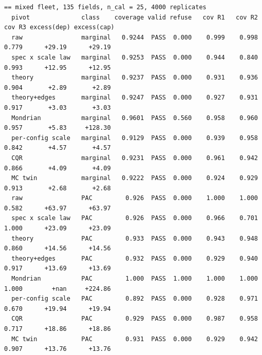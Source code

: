 \documentclass[preprint,12pt,authoryear]{elsarticle}
\begin{document}
\begin{Verbatim}[fontsize=\tiny,breaklines]
== mixed fleet, 135 fields, n_cal = 25, 4000 replicates
  pivot              class    coverage valid refuse   cov R1   cov R2   cov R3 excess(dep) excess(cap)
  raw                marginal   0.9244  PASS  0.000    0.999    0.998    0.779      +29.19      +29.19
  spec x scale law   marginal   0.9253  PASS  0.000    0.944    0.840    0.993      +12.95      +12.95
  theory             marginal   0.9237  PASS  0.000    0.931    0.936    0.904       +2.89       +2.89
  theory+edges       marginal   0.9247  PASS  0.000    0.927    0.931    0.917       +3.03       +3.03
  Mondrian           marginal   0.9601  PASS  0.560    0.958    0.960    0.957       +5.83     +128.30
  per-config scale   marginal   0.9129  PASS  0.000    0.939    0.958    0.842       +4.57       +4.57
  CQR                marginal   0.9231  PASS  0.000    0.961    0.942    0.866       +4.09       +4.09
  MC twin            marginal   0.9222  PASS  0.000    0.924    0.929    0.913       +2.68       +2.68
  raw                PAC         0.926  PASS  0.000    1.000    1.000    0.582      +63.97      +63.97
  spec x scale law   PAC         0.926  PASS  0.000    0.966    0.701    1.000      +23.09      +23.09
  theory             PAC         0.933  PASS  0.000    0.943    0.948    0.860      +14.56      +14.56
  theory+edges       PAC         0.932  PASS  0.000    0.929    0.940    0.917      +13.69      +13.69
  Mondrian           PAC         1.000  PASS  1.000    1.000    1.000    1.000        +nan     +224.86
  per-config scale   PAC         0.892  PASS  0.000    0.928    0.971    0.670      +19.94      +19.94
  CQR                PAC         0.929  PASS  0.000    0.987    0.958    0.717      +18.86      +18.86
  MC twin            PAC         0.931  PASS  0.000    0.929    0.942    0.907      +13.76      +13.76


\end{Verbatim}
\end{document}
